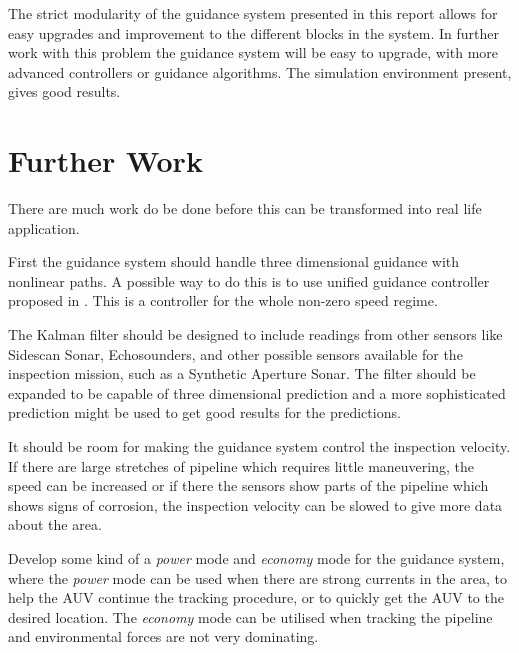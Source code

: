 	The strict modularity of the guidance system presented in this report allows for easy upgrades and
	improvement to the different blocks in the system. In further work with this problem the guidance
	system will be easy to upgrade, with more advanced controllers or guidance algorithms. The simulation
	environment present, gives good results.

	
\section{Further Work}
	There are much work do be done before this can be transformed into real life application.
	
	First the guidance system should handle three dimensional guidance with nonlinear paths. A possible way to 
	do this is to use unified guidance controller proposed in \cite{control-concept-AUV}. This is a 
	controller for the whole non-zero speed regime.

	The Kalman filter should be designed to include readings from other sensors like Sidescan Sonar,
	Echosounders, and other possible sensors available for the inspection mission, such as a Synthetic
	Aperture Sonar. The filter should be
	expanded to be capable of three dimensional prediction and a more sophisticated prediction might be
	used to get good results for the predictions. 
	
	It should be room for making the guidance system control the inspection velocity. If there are large 
	stretches of pipeline
	which requires little maneuvering, the speed can be increased or if there the sensors show parts of the
	pipeline which shows signs of corrosion, the inspection velocity can be slowed to give more data about
	the area.

	Develop some kind of a \textit{power} mode and \textit{economy} mode for the guidance system, where 
	the \textit{power} mode can be used when there are strong currents in the area, to help the AUV
	continue the tracking procedure, or to quickly get the AUV to the desired location. The
	\textit{economy} mode can be utilised when tracking the pipeline and environmental forces are not very
	dominating. 

	
